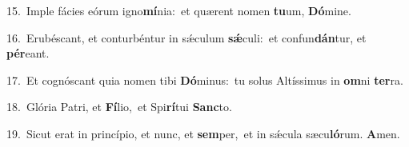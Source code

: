 {\numbfont\textcolor{\numbcolor}{15.}}~Imple fácies eórum igno\-\textbf{mí}\-nia:~\star et quærent nomen \textbf{tu}\-um, \textbf{Dó}\-mine.\par
{\numbfont\textcolor{\numbcolor}{16.}}~Erubéscant, et conturbéntur in sǽculum \textbf{sǽ}\-culi:~\star et confun\-\textbf{dán}\-tur, et \textbf{pér}\-eant.\par
{\numbfont\textcolor{\numbcolor}{17.}}~Et cognóscant quia nomen tibi \textbf{Dó}\-minus:~\star tu solus Altíssimus in \textbf{om}\-ni \textbf{ter}\-ra.\par
{\numbfont\textcolor{\numbcolor}{18.}}~Glória Patri, et \textbf{Fí}\-lio,~\star et Spi\-\textbf{rí}\-tui \textbf{Sanc}\-to.\par
{\numbfont\textcolor{\numbcolor}{19.}}~Sicut erat in princípio, et nunc, et \textbf{sem}\-per,~\star et in sǽcula sæcu\-\textbf{ló}\-rum. \textbf{A}\-men.\par
